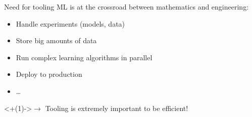 \begin{frame}{Need for tooling}
  ML is at the crossroad between mathematics and engineering:
  \begin{itemize}[<+(1)->]
    \item Handle experiments (models, data)
    \item Store big amounts of data
    \item Run complex learning algorithms in parallel
    \item Deploy to production
    \item …
  \end{itemize}
  \onslide<+(1)->{$\rightarrow$ Tooling is extremely important to be efficient!}
\end{frame}
